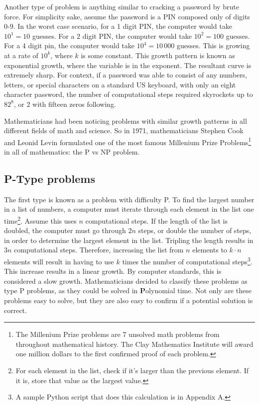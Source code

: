 \documentclass[10pt,journal,compsoc]{IEEEtran}
\begin{document}
Another type of problem is anything similar to cracking a password by brute force. For simplicity sake, assume the password is a PIN composed only of digits 0-9. In the worst case scenario, for a 1 digit PIN, the computer would take $10^1=10$ guesses. For a 2 digit PIN, the computer would take $10^2 = 100$ guesses. For a 4 digit pin, the computer would take $10^4=10\,000$ guesses. This is growing at a rate of $10^k$, where $k$ is some constant. This growth pattern is known as exponential growth, where the variable is in the exponent. The resultant curve is extremely sharp. For context, if a password was able to consist of any numbers, letters, or special characters on a standard US keyboard, with only an eight character password, the number of computational steps required skyrockets up to $82^8$, or 2 with fifteen zeros following. 

Mathematicians had been noticing problems with similar growth patterns in all different fields of math and science. So in 1971, mathematicians Stephen Cook and Leonid Levin formulated one of the most famous Millenium Prize Problems\footnote{The Millenium Prize problems are 7 unsolved math problems from throughout mathematical history. The Clay Mathematics Institute will award one million dollars to the first confirmed proof of each problem.} in all of mathematics: the P vs NP problem.
\subsection{P-Type problems} The first type is known as a problem with difficulty P. To find the largest number in a list of numbers, a computer must iterate through each element in the list one time\footnote{For each element in the list, check if it's larger than the previous element. If it is, store that value as the largest value.}. Assume this uses $n$ computational steps. If the length of the list is doubled, the computer must go through $2n$ steps, or double the number of steps, in order to determine the largest element in the list. Tripling the length results in $3n$ computational steps. Therefore, increasing the list from $n$ elements to $k\cdot n $ elements will result in having to use $k$ times the number of computational steps\footnote{A sample Python script that does this calculation is in Appendix A.}. This increase results in a linear growth. By computer standards, this is considered a slow growth. Mathematicians decided to classify these problems as type P problems, as they could be solved in  \textbf{P}olynomial time. Not only are these problems easy to solve, but they are also easy to confirm if a potential solution is correct. 
\end{document}
